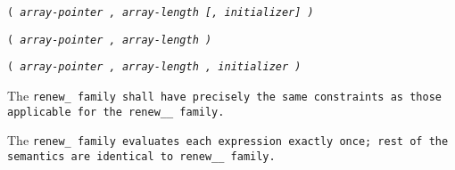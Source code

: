 
\s\s\s\tt{(} \it{array-pointer} \tt{,} \it{array-length}
[\tt{,} \it{initializer}] \tt{)}

\s\tt{(} \it{array-pointer} \tt{,} \it{array-length} \tt{)}

\s\tt{(} \it{array-pointer} \tt{,} \it{array-length}
\phantom{[}\tt{,} \it{initializer}\phantom{]} \tt{)}


The \tt{renew_} family shall have precisely the same
constraints as those applicable for the \tt{renew__} family.


The \tt{renew_} family evaluates each expression exactly once;
rest of the semantics are identical to  \tt{renew__} family.
